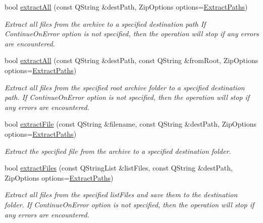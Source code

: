 \begin{DoxyCompactItemize}
bool \hyperlink{class_ab_zip_ac32a9ad3665fea51a0d3977e251ade73}{extract\+All} (const Q\+String \&dest\+Path, Zip\+Options options=\hyperlink{class_ab_zip_a9c4f57d6b8d9a449c2eb6c4d4e53c9d5a5fbbad9051dbd556f6c66ecb88bb7633}{Extract\+Paths})
\begin{DoxyCompactList}\small\item\em Extract all files from the archive to a specified destination path If Continue\+On\+Error option is not specified, then the operation will stop if any errors are encountered. \end{DoxyCompactList}\item 
bool \hyperlink{class_ab_zip_af5c5a08bd8f20b04c93c1f6ecb05a020}{extract\+All} (const Q\+String \&dest\+Path, const Q\+String \&from\+Root, Zip\+Options options=\hyperlink{class_ab_zip_a9c4f57d6b8d9a449c2eb6c4d4e53c9d5a5fbbad9051dbd556f6c66ecb88bb7633}{Extract\+Paths})
\begin{DoxyCompactList}\small\item\em Extract all files from the specified root archive folder to a specified destination path. If Continue\+On\+Error option is not specified, then the operation will stop if any errors are encountered. \end{DoxyCompactList}\item 
bool \hyperlink{class_ab_zip_a699adc1eaa924986e2ef2e2b3f9ab333}{extract\+File} (const Q\+String \&filename, const Q\+String \&dest\+Path, Zip\+Options options=\hyperlink{class_ab_zip_a9c4f57d6b8d9a449c2eb6c4d4e53c9d5a5fbbad9051dbd556f6c66ecb88bb7633}{Extract\+Paths})
\begin{DoxyCompactList}\small\item\em Extract the specified file from the archive to a specified destination folder. \end{DoxyCompactList}\item 
bool \hyperlink{class_ab_zip_a23498ad8f7c7600e771ecb1ca022d4ad}{extract\+Files} (const Q\+String\+List \&list\+Files, const Q\+String \&dest\+Path, Zip\+Options options=\hyperlink{class_ab_zip_a9c4f57d6b8d9a449c2eb6c4d4e53c9d5a5fbbad9051dbd556f6c66ecb88bb7633}{Extract\+Paths})
\begin{DoxyCompactList}\small\item\em Extract all files from the specified list\+Files and save them to the destination folder. If Continue\+On\+Error option is not specified, then the operation will stop if any errors are encountered. \end{DoxyCompactList}\item 

\end{DoxyCompactItemize}
